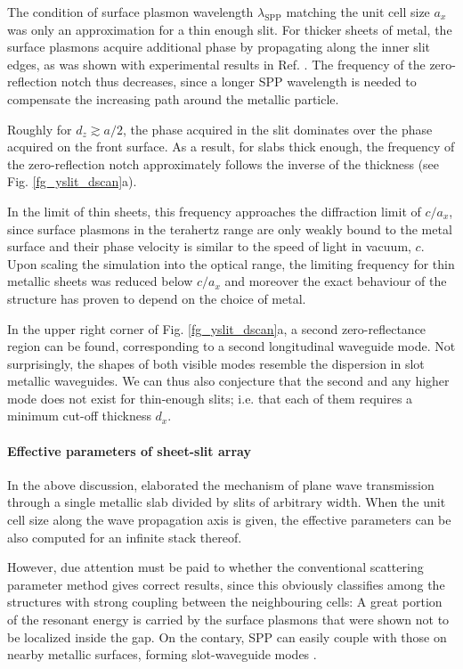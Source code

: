 The condition of surface plasmon wavelength $\lambda_{\text{SPP}}$ matching the unit cell size $a_x$ was only an approximation for a thin enough slit. For thicker sheets of metal, the surface plasmons acquire additional phase by propagating along the inner slit edges, as was shown with experimental results in Ref. \cite{weiner2011electromagnetics}. The frequency of the zero-reflection notch thus decreases, since a longer SPP wavelength is needed to compensate the increasing path around the metallic particle. 

Roughly for $d_z \gtrsim a/2$, the phase acquired in the slit dominates over the phase acquired on the front surface. As a result, 
for slabs thick enough, the frequency of the zero-reflection notch approximately follows the inverse of the thickness (see Fig. \ref{fg_yslit_dscan}a). 

In the limit of thin sheets, this frequency approaches the diffraction limit of $c/a_x$, since surface plasmons in the terahertz range are only weakly bound to the metal surface and their phase velocity is similar to the speed of light in vacuum, $c$. Upon scaling the simulation into the optical range, the limiting frequency for thin metallic sheets was reduced below $c/a_x$ and moreover the exact behaviour of the structure has proven to depend on the choice of metal.

In the upper right corner of Fig. \ref{fg_yslit_dscan}a, a second zero-reflectance region can be found, corresponding to a second longitudinal waveguide mode. Not surprisingly, the shapes of both visible modes resemble the dispersion in slot metallic waveguides. We can thus also conjecture that the second and any higher mode does not exist for thin-enough slits; i.e. that each of them requires a minimum cut-off thickness $d_x$.

\paragraph{Effective parameters of sheet-slit array}%
In the above discussion, elaborated the mechanism of plane wave transmission through a single metallic slab divided by slits of arbitrary width. When the unit cell size along the wave propagation axis is given, the effective parameters can be also computed for an infinite stack thereof.

However, due attention must be paid to whether the conventional scattering parameter method gives correct results, since this obviously classifies among the structures with strong coupling between the neighbouring cells: A great portion of the resonant energy is carried by the surface plasmons that were shown not to be localized inside the gap. On the contary, SPP can easily couple with those on nearby metallic surfaces, forming slot-waveguide modes \cite{weiner2011electromagnetics}.

